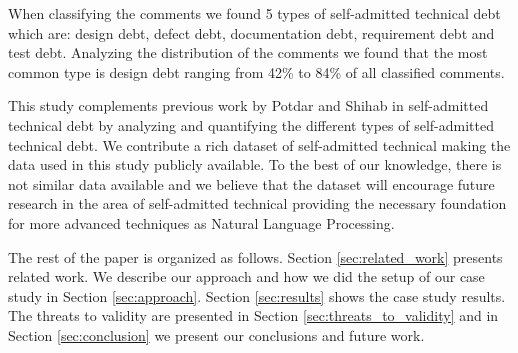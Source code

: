 When classifying the comments we found 5 types of self-admitted technical debt which are: design debt, defect debt, documentation debt, requirement debt and test debt. Analyzing the distribution of the comments we found that the most common type is design debt ranging from 42\% to 84\% of all classified comments. 

This study complements previous work by Potdar and Shihab \cite{Potdar2014ICSME} in self-admitted technical debt by analyzing and quantifying the different types of self-admitted technical debt. We contribute a rich dataset of self-admitted technical making the data used in this study publicly available. To the best of our knowledge, there is not similar data available and we believe that the dataset will encourage future research in the area of self-admitted technical providing the necessary foundation for more advanced techniques as Natural Language Processing.  

The rest of the paper is organized as follows. Section \ref{sec:related_work} presents related work. We describe our approach and how we did the setup of our case study in Section \ref{sec:approach}. Section \ref{sec:results} shows the case study results. The threats to validity are presented in Section \ref{sec:threats_to_validity} and in Section \ref{sec:conclusion} we present our conclusions and future work. 